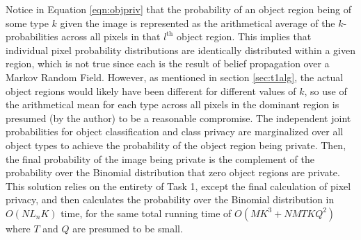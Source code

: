 \documentclass[11pt]{article}
\begin{document}
Notice in Equation \ref{eqn:objpriv} that the probability of an object region being of some type $k$ given the image is represented as the arithmetical average of the $k$-probabilities across all pixels in that $l^\textrm{th}$ object region.  This implies that individual pixel probability distributions are identically distributed within a given region, which is not true since each is the result of belief propagation over a Markov Random Field.  However, as mentioned in section \ref{sec:t1alg}, the actual object regions would likely have been different for different values of $k$, so use of the arithmetical mean for each type across all pixels in the dominant region is presumed (by the author) to be a reasonable compromise.  The independent joint probabilities for object classification and class privacy are marginalized over all object types to achieve the probability of the object region being private.  Then, the final probability of the image being private is the complement of the probability over the Binomial distribution that zero object regions are private.  This solution relies on the entirety of Task 1, except the final calculation of pixel privacy, and then calculates the probability over the Binomial distribution in $O(N L_n K)$ time, for the same total running time of $O(MK^3 + NMTKQ^2)$ where $T$ and $Q$ are presumed to be small.



 




\newpage
{}





\end{document}
